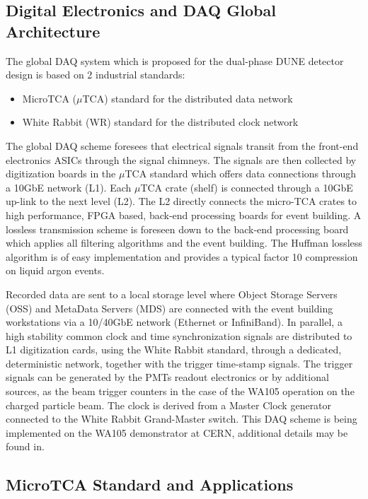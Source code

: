 \subsection{Digital Electronics and DAQ Global Architecture}

The global DAQ system which is proposed for the dual-phase DUNE
detector design is based on 2 industrial standards:
\begin{itemize}
\item MicroTCA ($\mu$TCA) standard for the distributed data network\cite{mTCA-standard}
\item White Rabbit (WR) standard for the distributed clock network\cite{WR-standard}
\end{itemize}

The global DAQ scheme foresees that electrical signals transit from
the front-end electronics ASICs through the signal chimneys. The
signals are then collected by digitization boards in the $\mu$TCA
standard which offers data connections through a 10GbE network
(L1). Each $\mu$TCA crate (shelf) is connected through a 10GbE up-link
to the next level (L2). The L2 directly connects the micro-TCA crates
to high performance, FPGA based, back-end processing boards for event
building. A lossless transmission scheme is foreseen down to the
back-end processing board which applies all filtering algorithms and
the event building. The Huffman lossless algorithm is of easy
implementation and provides a typical factor 10 compression on liquid
argon events.

Recorded data are sent to a local storage level where Object Storage
Servers (OSS) and MetaData Servers (MDS) are connected with the event
building workstations via a 10/40GbE network (Ethernet or
InfiniBand). In parallel, a high stability common clock and time
synchronization signals are distributed to L1 digitization cards,
using the White Rabbit standard, through a dedicated, deterministic
network, together with the trigger time-stamp signals. The trigger
signals can be generated by the PMTs readout electronics or by
additional sources, as the beam trigger counters in the case of the
WA105 operation on the charged particle beam. The clock is derived
from a Master Clock generator connected to the White Rabbit
Grand-Master switch. This DAQ scheme is being implemented on the WA105
demonstrator at CERN, additional details may be found
in\cite{WA105_TDR}.

\subsection{MicroTCA Standard and Applications}

